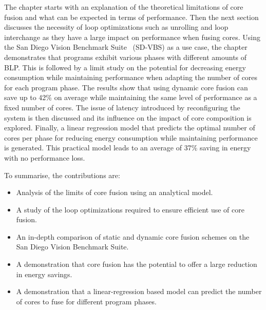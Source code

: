 The chapter starts with an explanation of the theoretical limitations of core fusion and what can be expected in terms of performance.
Then the next section discusses the necessity of loop optimizations such as unrolling and loop interchange as they have a large impact on performance when fusing cores.
Using the San Diego Vision Benchmark Suite~\cite{sdvbs} (SD-VBS) as a use case, the chapter demonstrates that programs exhibit various phases with different amounts of BLP.
This is followed by a limit study on the potential for decreasing energy consumption while maintaining performance when adapting the number of cores for each program phase.
The results show that using dynamic core fusion can save up to 42\% on average while maintaining the same level of performance as a fixed number of cores.
The issue of latency introduced by reconfiguring the system is then discussed and its influence on the impact of core composition is explored.
Finally, a linear regression model that predicts the optimal number of cores per phase for reducing energy consumption while maintaining performance is generated.
This practical model leads to an average of 37\% saving in energy with no performance loss.

To summarise, the contributions are:

\begin{itemize}
\item Analysis of the limits of core fusion using an analytical model.
\vspace{-1em}
\item A study of the loop optimizations required to ensure efficient use of core fusion.
\vspace{-2.5em}
\item An in-depth comparison of static and dynamic core fusion schemes on the San Diego Vision Benchmark Suite.
\vspace{-1em}
\item A demonstration that core fusion has the potential to offer a large reduction in energy savings.
\vspace{-1em}
\item A demonstration that a linear-regression based model can predict the number of cores to fuse for different program phases.
\end{itemize}



